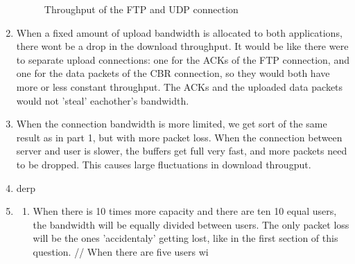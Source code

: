 \documentclass[a4paper,12pt,titlepage]{report}
\begin{document}
\begin{enumerate}
\begin{figure}[htb]
\caption{Throughput of the FTP and UDP connection}
\label{upAndDown}
\end{figure}
\item When a fixed amount of upload bandwidth is allocated to both applications, there wont be a drop in the download throughput. It would be like there were to separate upload connections: one for the ACKs of the FTP connection, and one for the data packets of the CBR connection, so they would both have more or less constant throughput. The ACKs and the uploaded data packets would not 'steal' eachother's bandwidth. 
\item When the connection bandwidth is more limited, we get sort of the same result as in part 1, but with more packet loss. When the connection between server and user is slower, the buffers get full very fast, and more packets need to be dropped. This causes large fluctuations in download througput. \\
\item derp
\item 
\begin{enumerate}
  \item When there is 10 times more capacity and there are ten 10 equal users, the bandwidth will be equally divided between users. The only packet loss will be the ones 'accidentaly' getting lost, like in the first section of this question. //
  When there are five users wi
\end{enumerate}

\end{enumerate}
\end{document}

